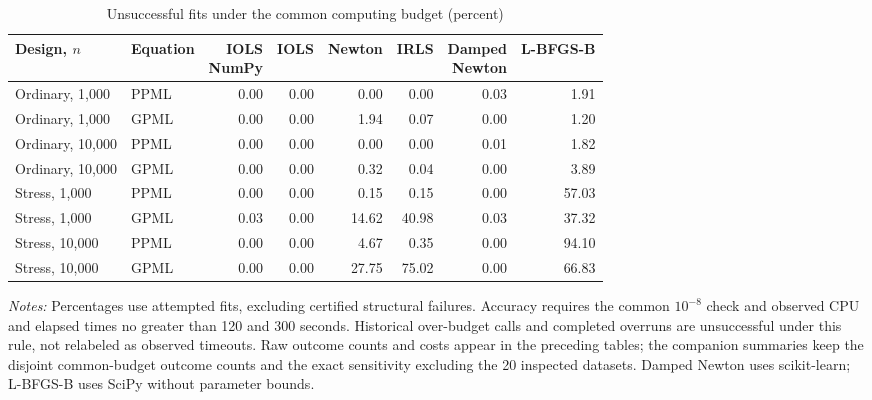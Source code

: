 \begin{table}[p]
\centering
\begin{singlespace}
\normalsize
\caption{Unsuccessful fits under the common computing budget (percent)}
\label{tab:solver-all-six-common-cap}
\setlength{\tabcolsep}{3pt}
\begin{tabular}{@{}llrrrrrr@{}}
\toprule
Design, \(n\) & Equation & \shortstack{IOLS\\NumPy} & IOLS & Newton & IRLS & \shortstack{Damped\\Newton} & L-BFGS-B\\
\midrule
Ordinary, 1,000 & PPML & 0.00 & 0.00 & 0.00 & 0.00 & 0.03 & 1.91\\
Ordinary, 1,000 & GPML & 0.00 & 0.00 & 1.94 & 0.07 & 0.00 & 1.20\\
Ordinary, 10,000 & PPML & 0.00 & 0.00 & 0.00 & 0.00 & 0.01 & 1.82\\
Ordinary, 10,000 & GPML & 0.00 & 0.00 & 0.32 & 0.04 & 0.00 & 3.89\\
Stress, 1,000 & PPML & 0.00 & 0.00 & 0.15 & 0.15 & 0.00 & 57.03\\
Stress, 1,000 & GPML & 0.03 & 0.00 & 14.62 & 40.98 & 0.03 & 37.32\\
Stress, 10,000 & PPML & 0.00 & 0.00 & 4.67 & 0.35 & 0.00 & 94.10\\
Stress, 10,000 & GPML & 0.00 & 0.00 & 27.75 & 75.02 & 0.00 & 66.83\\
\bottomrule
\end{tabular}
\par\smallskip
\begin{minipage}{\linewidth}
\footnotesize\textit{Notes:} Percentages use attempted fits, excluding certified structural failures. Accuracy requires the common \(10^{-8}\) check and observed CPU and elapsed times no greater than 120 and 300 seconds. Historical over-budget calls and completed overruns are unsuccessful under this rule, not relabeled as observed timeouts. Raw outcome counts and costs appear in the preceding tables; the companion summaries keep the disjoint common-budget outcome counts and the exact sensitivity excluding the 20 inspected datasets. Damped Newton uses scikit-learn; L-BFGS-B uses SciPy without parameter bounds.
\end{minipage}
\end{singlespace}
\end{table}
